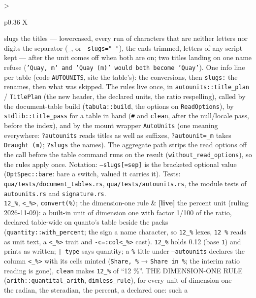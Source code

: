 \documentclass{report}
\newcommand{\live}{\textbf{\textcolor{blue!60!black}{[live]}}\xspace}
\begin{document}
\begin{xltabular}{\textwidth}{>{\raggedright\arraybackslash}p{0.36\textwidth} X}
    slugs the titles — lowercased, every run of characters that are
    neither letters nor digits the separator (\texttt{\_}, or
    \texttt{--slugs="-"}), the ends trimmed, letters of any script
    kept — after the unit comes off when both are on; two titles
    landing on one name refuse (\texttt{'Quay, m' and 'Quay (m)' would
    both become 'Quay'}). One info line per table (code
    \texttt{AUTOUNITS}, site the table's): the conversions, then
    \texttt{slugs:} the renames, then what was skipped. The rules
    live once, in \texttt{autounits::title\_plan} /
    \texttt{TitlePlan} (the new header, the declared units, the ratio
    respelling), called by the document-table build
    (\texttt{tabula::build}, the options on \texttt{ReadOptions}),
    by \texttt{stdlib::title\_pass} for a table in hand (\texttt{\#}
    and \texttt{clean}, after the null/locale pass, before the index),
    and by the mount wrapper \texttt{AutoUnits} (one meaning
    everywhere: \texttt{?autounits} reads titles as well as suffixes,
    \texttt{?autounit=\_m} takes \texttt{Draught (m)}; \texttt{?slugs}
    the names). The aggregate path strips the read options off the
    call before the table command runs on the result
    (\texttt{without\_read\_options}), so the rules apply once.
    Notation: \texttt{--slugs[=sep]} is the bracketed optional value
    (\texttt{OptSpec::bare}: bare a switch, valued it carries it).
    Tests: \texttt{qua/tests/document\_tables.rs},
    \texttt{qua/tests/autounits.rs}, the module tests of
    \texttt{autounits.rs} and \texttt{signature.rs}. \\
\texttt{12\_\%}, \texttt{<\_\%>}, \texttt{convert(\%)}; the dimension-one rule
  & \live the percent unit (ruling 2026-11-09): a built-in unit of
    dimension one with factor 1/100 of the ratio, declared table-wide
    on quanto's table beside the packs (\texttt{quantity::with\_percent};
    the sign a name character, so \texttt{12\_\%} lexes, \texttt{12 \%}
    reads as unit text, a \texttt{<\_\%>} trait and \texttt{-c=:col<\_\%>}
    cast). \texttt{12\_\%} holds 0.12 (base \texttt{1}) and prints as
    written; \texttt{| type} says quantity; a \texttt{\%} title under
    \texttt{--autounits} declares the column \texttt{<\_\%>} with its cells
    minted (\texttt{Share, \%} → \texttt{Share in \%}; the interim ratio
    reading is gone), \texttt{clean} makes \texttt{12\_\%} of ``12 \%''.
    THE DIMENSION-ONE RULE (\texttt{arith::quantital\_arith},
    \texttt{dimless\_rule}), for every unit of dimension one — the
    radian, the steradian, the percent, a declared one: such a

\end{xltabular}
\end{document}
